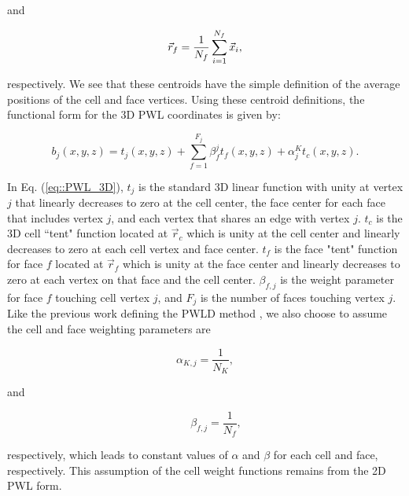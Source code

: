 \noindent and

\begin{equation}
\label{eq::PWL_3D_face_center}
	\vec{r}_{f} = \frac{1}{N_f} \sum\displaylimits_{i=1}^{N_f} \vec{x}_i ,
\end{equation}

\noindent respectively. We see that these centroids have the simple definition of the average positions of the cell and face vertices. Using these centroid definitions, the functional form for the 3D PWL coordinates is given by:

\begin{equation}
\label{eq::PWL_3D}
	b_j (x,y,z)  = t_j  (x,y,z) + \sum_{f=1}^{F_j} \beta_f^j  t_f (x,y,z) + \alpha_j^K t_c  (x,y,z) .
\end{equation}

\noindent In Eq. (\ref{eq::PWL_3D}), $t_j$ is the standard 3D linear function with unity at vertex $j$ that linearly decreases to zero at the cell center, the face center for each face that includes vertex $j$, and each vertex that shares an edge with vertex $j$. $t_c$ is the 3D cell ``tent" function located at $\vec{r}_c$ which is unity at the cell center and linearly decreases to zero at each cell vertex and face center. $t_f$ is the face "tent" function for face $f$ located at $\vec{r}_{f}$ which is unity at the face center and linearly decreases to zero at each vertex on that face and the cell center. $\beta_{f,j}$ is the weight parameter for face $f$ touching cell vertex $j$, and $F_j$ is the number of faces touching vertex $j$. Like the previous work defining the PWLD method \cite{bailey2008phd}, we also choose to assume the cell and face weighting parameters are

\begin{equation}
\alpha_{K,j} = \frac{1}{N_K},
\label{eq::PWL_center_weight_val}
\end{equation}

\noindent and

\begin{equation}
\qquad \beta_{f,j} = \frac{1}{N_f},
\label{eq::PWL_face_weight_val}
\end{equation}

\noindent respectively, which leads to constant values of $\alpha$ and $\beta$ for each cell and face, respectively. This assumption of the cell weight functions remains from the 2D PWL form. 



